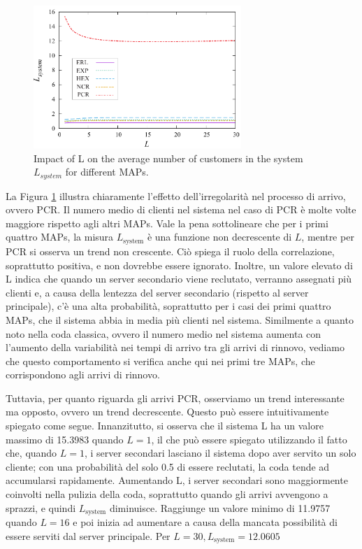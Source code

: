 \documentclass[11pt]{article}
\begin{document}
\begin{figure}[h]
    \centering
    \includegraphics[width=0.7\textwidth]{gtHnIzQ.png}
    \caption{Impact of L on the average number of customers in the system $L_{system}$ for different MAPs.}
    \label{fig:1}
\end{figure}
La Figura \ref{fig:1} illustra chiaramente l'effetto dell'irregolarità nel processo di arrivo, ovvero PCR. Il numero medio di clienti nel sistema nel caso di PCR è molte volte maggiore rispetto agli altri MAPs. Vale la pena sottolineare che per i primi quattro MAPs, la misura $L_\text{system}$ è una funzione non decrescente di $L$, mentre per PCR si osserva un trend non crescente. Ciò spiega il ruolo della correlazione, soprattutto positiva, e non dovrebbe essere ignorato. Inoltre, un valore elevato di L indica che quando un server secondario viene reclutato, verranno assegnati più clienti e, a causa della lentezza del server secondario (rispetto al server principale), c'è una alta probabilità, soprattutto per i casi dei primi quattro MAPs, che il sistema abbia in media più clienti nel sistema. Similmente a quanto noto nella coda classica, ovvero il numero medio nel sistema aumenta con l'aumento della variabilità nei tempi di arrivo tra gli arrivi di rinnovo, vediamo che questo comportamento si verifica anche qui nei primi tre MAPs, che corrispondono agli arrivi di rinnovo. \vspace{0.4cm}

\noindent Tuttavia, per quanto riguarda gli arrivi PCR, osserviamo un trend interessante ma opposto, ovvero un trend decrescente. Questo può essere intuitivamente spiegato come segue. Innanzitutto, si osserva che il sistema L ha un valore massimo di 15.3983 quando $L = 1$, il che può essere spiegato utilizzando il fatto che, quando $L = 1$, i server secondari lasciano il sistema dopo aver servito un solo cliente; con una probabilità del solo 0.5 di essere reclutati, la coda tende ad accumularsi rapidamente. Aumentando L, i server secondari sono maggiormente coinvolti nella pulizia della coda, soprattutto quando gli arrivi avvengono a sprazzi, e quindi $L_\text{system}$ diminuisce. Raggiunge un valore minimo di 11.9757 quando $L = 16$ e poi inizia ad aumentare a causa della mancata possibilità di essere serviti dal server principale. Per $L = 30, L_\text{system} = 12.0605$ \vspace{0.4cm}
\end{document}
